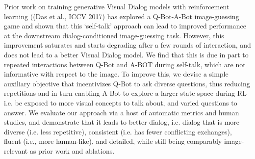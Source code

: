 Prior work on training generative Visual Dialog models with reinforcement learning ((Das et al., ICCV 2017) has explored a Q-Bot-A-Bot image-guessing game and shown that this   ‘self-talk’ approach can lead to improved performance at the downstream dialog-conditioned  image-guessing task. However, this improvement saturates and starts degrading after a few rounds of interaction, and does not lead to a better Visual Dialog model. We find that this is due in part to repeated interactions between Q-Bot and A-BOT during self-talk, which are not informative with respect to the image. To improve this, we devise a simple auxiliary objective that incentivizes Q-Bot to ask diverse questions, thus reducing repetitions and in turn enabling A-Bot to explore a larger state space during RL i.e. be exposed to more visual concepts to talk about, and varied questions to answer. We evaluate our approach via a host of automatic metrics and human studies, and demonstrate that it leads to better dialog, i.e. dialog that is more diverse (i.e. less repetitive), consistent (i.e. has fewer conflicting  exchanges), fluent (i.e., more human-like), and detailed, while still being comparably image-relevant as prior work and ablations.